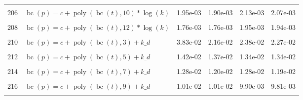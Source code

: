 \documentclass[12pt,a4paper]{article}
\DeclareMathOperator{\bc}{bc}
\DeclareMathOperator{\poly}{poly}
\begin{document}
\begin{longtable}[t]{ll>{\raggedleft\arraybackslash}p{2cm}>{\raggedleft\arraybackslash}p{2cm}>{\raggedleft\arraybackslash}p{2cm}>{\raggedleft\arraybackslash}p{2cm}}
\cellcolor{gray!6}{205} & \cellcolor{gray!6}{$\bc(p) = c + \poly\left( \bc(t), 9 \right) * \log(k)$} & \cellcolor{gray!6}{2.62e-03} & \cellcolor{gray!6}{2.51e-03} & \cellcolor{gray!6}{2.87e-03} & \cellcolor{gray!6}{2.74e-03}\\
206 & $\bc(p) = c + \poly\left( \bc(t), 10 \right) * \log(k)$ & 1.95e-03 & 1.90e-03 & 2.13e-03 & 2.07e-03\\
\cellcolor{gray!6}{207} & \cellcolor{gray!6}{$\bc(p) = c + \poly\left( \bc(t), 11 \right) * \log(k)$} & \cellcolor{gray!6}{1.86e-03} & \cellcolor{gray!6}{1.82e-03} & \cellcolor{gray!6}{2.05e-03} & \cellcolor{gray!6}{2.01e-03}\\
208 & $\bc(p) = c + \poly\left( \bc(t), 12 \right) * \log(k)$ & 1.76e-03 & 1.76e-03 & 1.95e-03 & 1.94e-03\\
\cellcolor{gray!6}{209} & \cellcolor{gray!6}{$\bc(p) = c + \poly\left( \bc(t), 13 \right) * \log(k)$} & \cellcolor{gray!6}{1.75e-03} & \cellcolor{gray!6}{1.75e-03} & \cellcolor{gray!6}{1.94e-03} & \cellcolor{gray!6}{1.94e-03}\\
210 & $\bc(p) = c + \poly\left( \bc(t), 3 \right) + k\_d$ & 3.83e-02 & 2.16e-02 & 2.38e-02 & 2.27e-02\\
\cellcolor{gray!6}{211} & \cellcolor{gray!6}{$\bc(p) = c + \poly\left( \bc(t), 4 \right) + k\_d$} & \cellcolor{gray!6}{2.87e-02} & \cellcolor{gray!6}{2.38e-02} & \cellcolor{gray!6}{2.66e-02} & \cellcolor{gray!6}{2.53e-02}\\
212 & $\bc(p) = c + \poly\left( \bc(t), 5 \right) + k\_d$ & 1.42e-02 & 1.37e-02 & 1.34e-02 & 1.34e-02\\
\cellcolor{gray!6}{213} & \cellcolor{gray!6}{$\bc(p) = c + \poly\left( \bc(t), 6 \right) + k\_d$} & \cellcolor{gray!6}{1.30e-02} & \cellcolor{gray!6}{1.21e-02} & \cellcolor{gray!6}{1.31e-02} & \cellcolor{gray!6}{1.20e-02}\\
214 & $\bc(p) = c + \poly\left( \bc(t), 7 \right) + k\_d$ & 1.28e-02 & 1.20e-02 & 1.28e-02 & 1.19e-02\\
\cellcolor{gray!6}{215} & \cellcolor{gray!6}{$\bc(p) = c + \poly\left( \bc(t), 8 \right) + k\_d$} & \cellcolor{gray!6}{1.01e-02} & \cellcolor{gray!6}{1.01e-02} & \cellcolor{gray!6}{9.92e-03} & \cellcolor{gray!6}{9.83e-03}\\
216 & $\bc(p) = c + \poly\left( \bc(t), 9 \right) + k\_d$ & 1.01e-02 & 1.01e-02 & 9.90e-03 & 9.81e-03\\
\cellcolor{gray!6}{217} & \cellcolor{gray!6}{$\bc(p) = c + \poly\left( \bc(t), 10 \right) + k\_d$} & \cellcolor{gray!6}{9.88e-03} & \cellcolor{gray!6}{9.85e-03} & \cellcolor{gray!6}{9.59e-03} & \cellcolor{gray!6}{9.56e-03}\\

\end{longtable}
\end{document}
